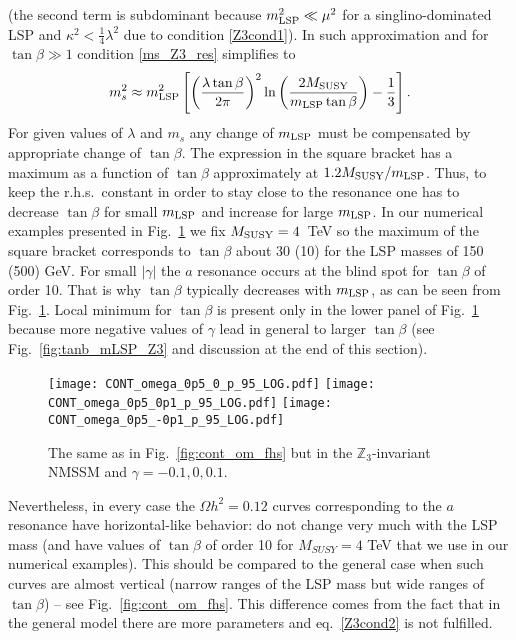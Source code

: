 \documentclass[12pt,twoside]{article}
\def\mlsp{m_{\rm LSP}}
\begin{document}
%
%
(the second term is subdominant because $\mlsp^2\ll\mu^2$ 
for a singlino-dominated LSP 
and $\kappa^2<\frac14\lambda^2$ due to condition \eqref{Z3cond1}).
In such approximation and for $\tan\beta\gg1$ condition \eqref{ms_Z3_res} 
simplifies to
%
%
\begin{equation}
\label{resonance_approx}
m_s^2 
\approx
\mlsp^2 \left[
\left(\frac{\lambda\tan\beta}{2\pi}\right)^2
\ln\left(\frac{2M_{\rm SUSY}}{\mlsp\tan\beta}\right) -\frac13
\right]
.
\end{equation}
%
%
For given values of $\lambda$ and $m_s$ any change of $\mlsp$ must be 
compensated by appropriate change of $\tan\beta$. 
The expression in the square bracket has a maximum as a function of $\tan\beta$ approximately at $1.2M_{\rm SUSY}/\mlsp$.
Thus, to keep the 
r.h.s.\ constant in order to stay close to the resonance one has to 
decrease $\tan\beta$ for small $\mlsp$ and increase for large $\mlsp$. In our numerical examples presented in Fig.~\ref{fig:cont_om_Z3} we fix $M_{\rm
SUSY}=4$~TeV so the maximum of the square bracket corresponds to $\tan\beta$ about 30 (10) for the LSP masses of 150 (500) GeV. For small $|\gamma|$
the $a$ resonance occurs at the blind spot for $\tan\beta$ of 
order 10. That is why $\tan\beta$ typically decreases with $\mlsp$, as can be seen from Fig.~\ref{fig:cont_om_Z3}. Local minimum for $\tan\beta$ is
present only in the lower panel of Fig.~\ref{fig:cont_om_Z3} because more negative values of $\gamma$ lead in general to larger $\tan\beta$ (see
Fig.~\ref{fig:tanb_mLSP_Z3} and discussion at the end of this section).
%
%
\begin{figure}[t]
\center
\texttt{[image: CONT\_omega\_0p5\_0\_p\_95\_LOG.pdf]}\hspace{-5ex}
\texttt{[image: CONT\_omega\_0p5\_0p1\_p\_95\_LOG.pdf]}
\hspace{-5ex}
\texttt{[image: CONT\_omega\_0p5\_-0p1\_p\_95\_LOG.pdf]}
\caption{The same as in Fig.~\ref{fig:cont_om_fhs} but in the $\mathbb{Z}_3$-invariant NMSSM and $\gamma=-0.1,0,0.1$.}
\label{fig:cont_om_Z3}
\end{figure}
%
%
Nevertheless, in every case the $\Omega h^2=0.12$ curves corresponding to the $a$ resonance 
have horizontal-like behavior: do not change very much with 
the LSP mass (and have values of $\tan\beta$ of 
order 10 for $M_{SUSY}=4$ TeV that we use in our numerical examples).
This should be compared to the general case when 
such curves are almost vertical (narrow ranges of the LSP mass but 
wide ranges of $\tan\beta$) -- see Fig.~\ref{fig:cont_om_fhs}.
This difference comes from the fact that in the general model there 
are more parameters and eq.~\eqref{Z3cond2} is not fulfilled.
\end{document}
